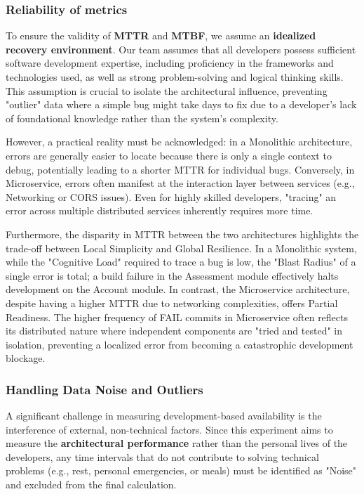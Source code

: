 \subsubsection{Reliability of metrics}

To ensure the validity of \textbf{MTTR} and \textbf{MTBF}, we assume an \textbf{idealized recovery environment}. Our 
team assumes that all developers possess sufficient software development expertise, including proficiency 
in the frameworks and technologies used, as well as strong problem-solving and logical thinking skills. 
This assumption is crucial to isolate the architectural influence, preventing "outlier" data where a simple 
bug might take days to fix due to a developer's lack of foundational knowledge rather than the system's complexity.

However, a practical reality must be acknowledged: in a Monolithic architecture, errors are generally 
easier to locate because there is only a single context to debug, potentially leading to a shorter MTTR
 for individual bugs. Conversely, in Microservice, errors often manifest at the interaction layer between 
 services (e.g., Networking or CORS issues). Even for highly skilled developers, "tracing" an error across 
 multiple distributed services inherently requires more time.

 Furthermore, the disparity in MTTR between the two architectures highlights the trade-off between Local Simplicity and Global Resilience. In a Monolithic system, while the "Cognitive Load" required to trace a bug is low, the "Blast Radius" of a single error is total; a build failure in the Assessment module effectively halts development on the Account module. In contrast, the Microservice architecture, despite having a higher MTTR due to networking complexities, offers Partial Readiness. The higher frequency of FAIL commits in Microservice often reflects its distributed nature where independent components are "tried and tested" in isolation, preventing a localized error from becoming a catastrophic development blockage.

\subsubsection{Handling Data Noise and Outliers}

A significant challenge in measuring development-based availability is the interference 
of external, non-technical factors. Since this experiment aims to measure 
the \textbf{architectural performance} rather than the personal lives of the developers, 
any time intervals that do not contribute to solving technical problems (e.g., rest, personal 
emergencies, or meals) must be identified as "Noise" and excluded from the final calculation.

